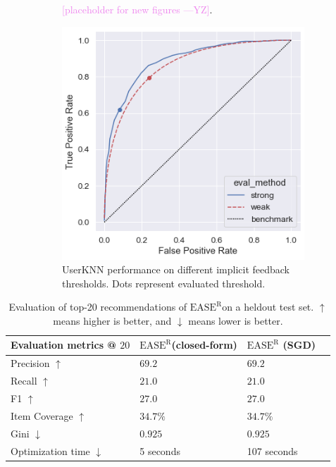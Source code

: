 \documentclass{article}
\newcommand{\easer}{$\text{EASE}^\text{R}$}
\newcommand{\userknn}{UserKNN\xspace}
\newcommand{\yiming}[1]{\textcolor{violet}{[#1 ---\textsc{YZ}]}}
\begin{document}
\begin{figure}[h]
\begin{subfigure}[b]{0.3\textwidth}
		\caption{\yiming{placeholder for new figures}.}
	\end{subfigure}
	\begin{subfigure}[b]{0.3\textwidth}
		\centering
		\includegraphics[width=\textwidth]{figures/user_knn_roc.png}
		\caption{\userknn performance on different implicit feedback thresholds. Dots represent evaluated threshold.}
	\end{subfigure}
	\caption{}
	\label{fig:1}
\end{figure}

\begin{table}[h]
	\centering
	\begin{tabular}{@{}llll@{}}
		\toprule
		Evaluation metrics @ $20$     & \easer (closed-form) & \easer
		(SGD)
		\\ \midrule
		Precision $\uparrow$          & $69.2$               & $69.2$
		\\
		Recall	$\uparrow$              & $21.0$               &
		$21.0$
		\\
		F1	$\uparrow$                  & $27.0$               &
		$27.0$
		\\
		Item Coverage	$\uparrow$       & $34.7\%$             &
		$34.7\%$
		\\
		Gini	$\downarrow$              & $0.925$              &
		$0.925$
		\\
		Optimization time	$\downarrow$ & 5 seconds
		                              & 107 seconds
		\\ \bottomrule
	\end{tabular}
	\caption{Evaluation of top-20 recommendations of \easer on a heldout
		test set. $\uparrow$ means higher is better, and $\downarrow$
		means
		lower is better.}
	\label{tab:easer-results}

\end{table}
\end{document}
